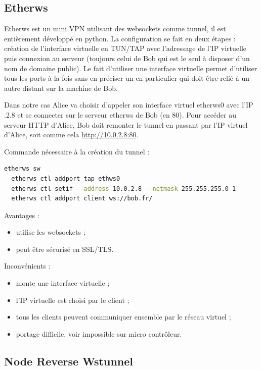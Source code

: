\subsection{Etherws}

Etherws est un mini VPN utilisant des websockets comme tunnel, il est
entièrement développé en python. La configuration se fait en deux
étapes : création de l'interface virtuelle en TUN/TAP avec l'adressage
de l'IP virtuelle puis connexion au serveur (toujours celui de Bob qui
est le seul à disposer d'un nom de domaine public). Le fait d'utiliser
une interface virtuelle permet d'utiliser tous les ports à la fois
sans en préciser un en particulier qui doit être relié à un autre
distant sur la machine de Bob.

Dans notre cas Alice va choisir d'appeler son interface virtuel \og
etherws0 \fg{} avec l'IP .2.8 \fg{} et se connecter sur le
serveur etherws de Bob (en 80). Pour accéder au serveur HTTP d'Alice,
Bob doit remonter le tunnel en passant par l'IP virtuel d'Alice, soit
comme cela \url{http://10.0.2.8:80}.

Commande nécessaire à la création du tunnel :
\begin{lstlisting}[language=bash]
  etherws sw
  etherws ctl addport tap ethws0
  etherws ctl setif --address 10.0.2.8 --netmask 255.255.255.0 1
  etherws ctl addport client ws://bob.fr/
\end{lstlisting}

Avantages :
\begin{itemize}
\item utilise les websockets ;
\item peut être sécurisé en SSL/TLS.
\end{itemize}

Inconvénients :
\begin{itemize}
    \item monte une interface virtuelle ;
    \item l'IP virtuelle est choisi par le client ;
    \item tous les clients peuvent communiquer ensemble par le réseau
      virtuel ;
    \item portage difficile, voir impossible sur micro contrôleur.
\end{itemize}

\subsection{Node Reverse Wstunnel}

